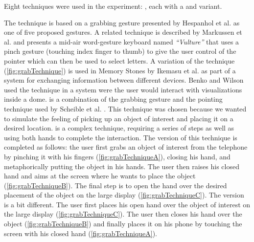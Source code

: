 Eight techniques were used in the experiment: \alltechniques, each with a \push and \pull variant.

The \grab technique is based on a grabbing gesture presented by Hespanhol et al. \cite{Hespanhol:2012} as one of five proposed gestures.
A related technique is described by Markussen et al. \cite{Markussen:2014} and presents a mid-air word-gesture keyboard named \emph{``Vulture''} that uses a pinch gesture (touching index finger to thumb) to give the user control of the pointer which can then be used to select letters.
A variation of the \grab technique (\cref{fig:grabTechnique}) is used in Memory Stones \cite{Ikematsu:2015} by Ikemasu et al. as part of a system for exchanging information between different devices. Benko and Wilson \cite{Benko:2010} used the \grab technique in a system were the user would interact with visualizations inside a dome. \grab is a combination of the grabbing gesture and the pointing technique used by Scheible et al. \cite{Scheible:2008}.
This technique was chosen because we wanted to simulate the feeling of picking up an object of interest and placing it on a desired location.
\grab is a complex technique, requiring a series of steps as well as using both hands to complete the interaction.
The \push version of this technique is completed as follows: the user first grabs an object of interest from the telephone by pinching it with his fingers (\cref{fig:grabTechniqueA}), closing his hand, and metaphorically putting the object in his hands.
The user then raises his closed hand and aims at the screen where he wants to place the object (\cref{fig:grabTechniqueB}).
The final step is to open the hand over the desired placement of the object on the large display (\cref{fig:grabTechniqueC}).
The \pull version is a bit different.
The user first places his open hand over the object of interest on the large display (\cref{fig:grabTechniqueC}).
The user then closes his hand over the object (\cref{fig:grabTechniqueB}) and finally places it on his phone by touching the screen with his closed hand (\cref{fig:grabTechniqueA}).  


